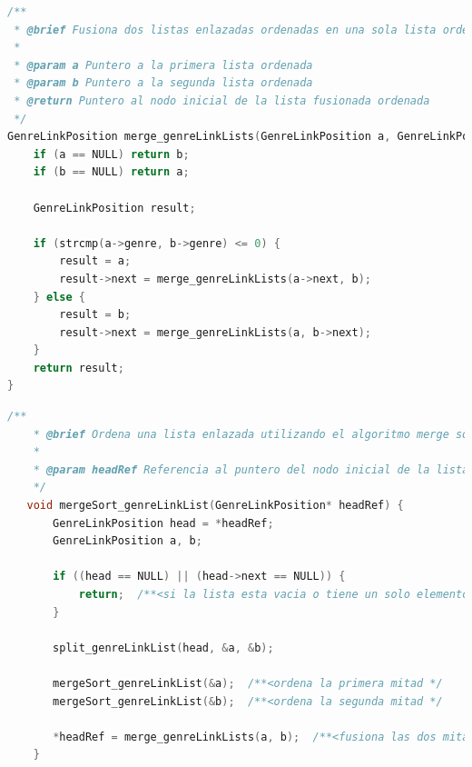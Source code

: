 \begin{lstlisting}[style=CodeStyle, language=C, caption={fusion de listas}, label={lst:codigo}]
    /**
 * @brief Fusiona dos listas enlazadas ordenadas en una sola lista ordenada
 *
 * @param a Puntero a la primera lista ordenada
 * @param b Puntero a la segunda lista ordenada
 * @return Puntero al nodo inicial de la lista fusionada ordenada
 */
GenreLinkPosition merge_genreLinkLists(GenreLinkPosition a, GenreLinkPosition b) {
    if (a == NULL) return b;
    if (b == NULL) return a;

    GenreLinkPosition result;

    if (strcmp(a->genre, b->genre) <= 0) {
        result = a;
        result->next = merge_genreLinkLists(a->next, b);
    } else {
        result = b;
        result->next = merge_genreLinkLists(a, b->next);
    }
    return result;
}
\end{lstlisting}

\begin{lstlisting}[style=CodeStyle, language=C, caption={mergerSort\_genreLinkList}, label={lst:codigo}]
    /**
    * @brief Ordena una lista enlazada utilizando el algoritmo merge sort.
    *
    * @param headRef Referencia al puntero del nodo inicial de la lista a ordenar.
    */
   void mergeSort_genreLinkList(GenreLinkPosition* headRef) {
       GenreLinkPosition head = *headRef;
       GenreLinkPosition a, b;
   
       if ((head == NULL) || (head->next == NULL)) {
           return;  /**<si la lista esta vacia o tiene un solo elemento, no hay que ordenar */ 
       }
   
       split_genreLinkList(head, &a, &b);
   
       mergeSort_genreLinkList(&a);  /**<ordena la primera mitad */
       mergeSort_genreLinkList(&b);  /**<ordena la segunda mitad */
   
       *headRef = merge_genreLinkLists(a, b);  /**<fusiona las dos mitades ordenadas */
    }
\end{lstlisting}

